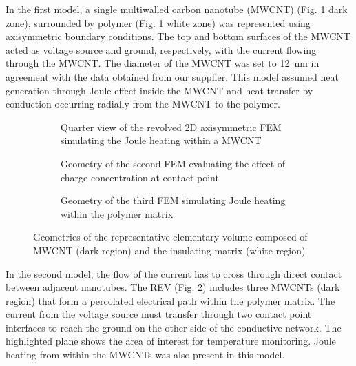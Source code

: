 \documentclass[11pt,review,times]{elsarticle}
\begin{document}
In the first model, a single multiwalled carbon nanotube (MWCNT) (Fig. \ref{fig:geometry_axisymmetric} dark zone), surrounded by polymer (Fig. \ref{fig:geometry_axisymmetric} white zone) was represented using axisymmetric boundary conditions. 
The top and bottom surfaces of the MWCNT acted as voltage source and ground, respectively, with the current flowing through the MWCNT. 
The diameter of the MWCNT was set to \SI{12}{\nano\metre} in agreement with the data obtained from our supplier. 
This model assumed heat generation through Joule effect inside the MWCNT and heat transfer by conduction occurring radially from the MWCNT to the polymer.

\begin{figure}[htb]
	\center
	\begin{subfigure}{40mm}
		\center
		\captionsetup{width=35mm}
		\caption{Quarter view of the revolved 2D axisymmetric FEM simulating the Joule heating within a MWCNT}
		\label{fig:geometry_axisymmetric}
	\end{subfigure}%
	\begin{subfigure}{55mm}
		\center
		\captionsetup{width=50mm}
		\caption{Geometry of the second FEM evaluating the effect of charge concentration at contact point}
		\label{fig:geometry_3D}
	\end{subfigure}
	\begin{subfigure}{40mm}
		\center
		\captionsetup{width=40mm}
		\caption{Geometry of the third FEM simulating Joule heating within the polymer matrix}
		\label{fig:geometry_gap}
	\end{subfigure} 
	\caption{Geometries of the representative elementary volume composed of MWCNT (dark region) and the insulating matrix (white region)}
	\label{fig:geometry}
\end{figure}

In the second model, the flow of the current has to cross through direct contact between adjacent nanotubes. 
The REV (Fig. \ref{fig:geometry_3D}) includes three MWCNTs (dark region) that form a percolated electrical path within the polymer matrix. 
The current from the voltage source must transfer through two contact point interfaces to reach the ground on the other side of the conductive network. 
The highlighted plane shows the area of interest for temperature monitoring. 
Joule heating from within the MWCNTs was also present in this model. 
\end{document}
